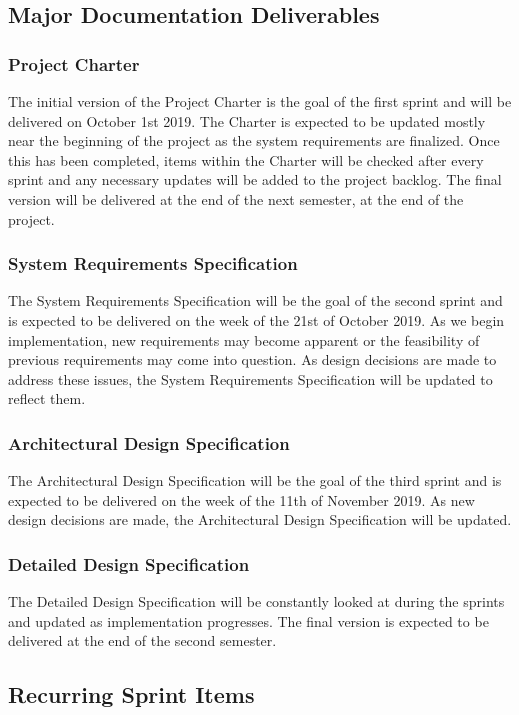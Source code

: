 \subsection{Major Documentation Deliverables}

\subsubsection{Project Charter}
The initial version of the Project Charter is the goal of the first sprint and will be delivered on October 1st 2019.
The Charter is expected to be updated mostly near the beginning of the project as the system requirements are finalized. Once this has been completed, items within the Charter will be checked after every sprint and any necessary updates will be added to the project backlog. The final version will be delivered at the end of the next semester, at the end of the project.

\subsubsection{System Requirements Specification}
The System Requirements Specification will be the goal of the second sprint and is expected to be delivered on the week of the 21st of October 2019. As we begin implementation, new requirements may become apparent or the feasibility of previous requirements may come into question. As design decisions are made to address these issues, the System Requirements Specification will be updated to reflect them.

\subsubsection{Architectural Design Specification}
The Architectural Design Specification will be the goal of the third sprint and is expected to be delivered on the week of the 11th of November 2019. As new design decisions are made, the Architectural Design Specification will be updated.

\subsubsection{Detailed Design Specification}
The Detailed Design Specification will be constantly looked at during the sprints and updated as implementation progresses. The final version is expected to be delivered at the end of the second semester.

\subsection{Recurring Sprint Items}

